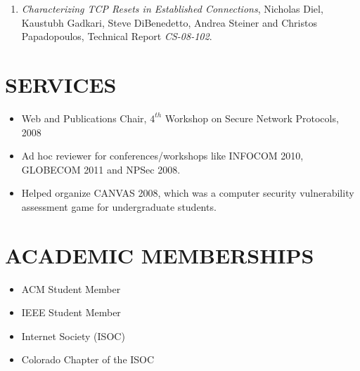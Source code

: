 \documentclass[line,margin]{res}
\begin{document}
\begin{resume}
\begin{enumerate}
               \item {\sl Characterizing TCP Resets in Established Connections}, Nicholas Diel, Kaustubh Gadkari, Steve DiBenedetto,
              Andrea Steiner and Christos Papadopoulos, 
              Technical Report {\emph {CS-08-102}}.
             \end{enumerate}

\section{SERVICES}
	\begin{itemize}
                \item Web and Publications Chair, $4^{th}$ Workshop on Secure Network Protocols, 2008
                \item Ad hoc reviewer for conferences/workshops like INFOCOM 2010, GLOBECOM 2011 and NPSec 2008.
                \item Helped organize CANVAS 2008, which was a computer security vulnerability assessment game for undergraduate students.            
         \end{itemize}
         
\section{ACADEMIC MEMBERSHIPS}
	\begin{itemize}
		\item ACM Student Member
		\item IEEE Student Member
		\item Internet Society (ISOC)
		\item Colorado Chapter of the ISOC               
	\end{itemize}
	







\end{resume}
\end{document}
